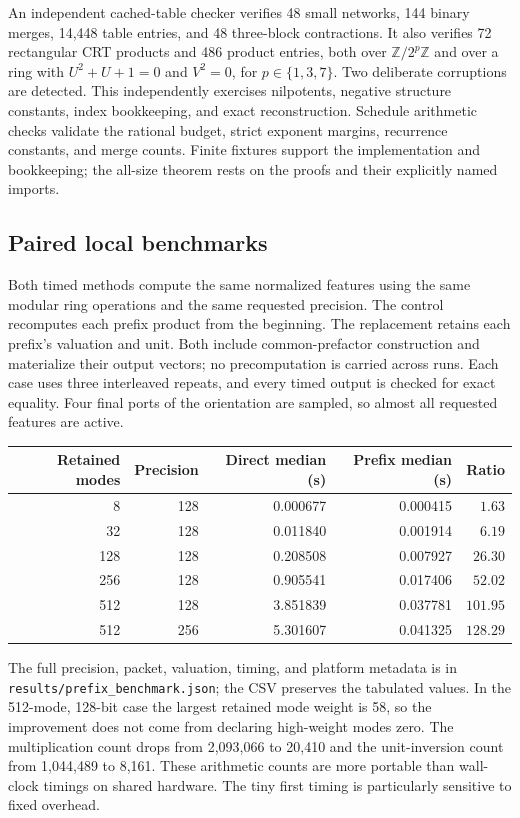 \documentclass[11pt,letterpaper]{article}
\theoremstyle{definition}\newtheorem{definition}[theorem]{Definition}
\theoremstyle{remark}\newtheorem{remark}[theorem]{Remark}
\begin{document}
An independent cached-table checker verifies 48 small networks, 144 binary merges,
14,448 table entries, and 48 three-block contractions. It also verifies 72 rectangular
CRT products and 486 product entries, both over $\mathbb Z/2^p\mathbb Z$ and over a
ring with $U^2+U+1=0$ and $V^2=0$, for $p\in\{1,3,7\}$. Two deliberate corruptions
are detected. This independently exercises nilpotents, negative structure constants,
index bookkeeping, and exact reconstruction. Schedule arithmetic checks validate the
rational budget, strict exponent margins, recurrence constants, and merge counts.
Finite fixtures support the implementation and bookkeeping; the all-size theorem rests
on the proofs and their explicitly named imports.

\subsection{Paired local benchmarks}
Both timed methods compute the same normalized features using the same modular ring
operations and the same requested precision. The control recomputes each prefix product
from the beginning. The replacement retains each prefix's valuation and unit. Both
include common-prefactor construction and materialize their output vectors; no
precomputation is carried across runs. Each case uses three interleaved repeats, and
every timed output is checked for exact equality. Four final ports of the orientation
are sampled, so almost all requested features are active.

\begin{center}
\begin{tabular}{@{}rrrrr@{}}
\toprule
Retained modes & Precision & Direct median (s) & Prefix median (s) & Ratio\\
\midrule
8 & 128 & 0.000677 & 0.000415 & $1.63$\\
32 & 128 & 0.011840 & 0.001914 & $6.19$\\
128 & 128 & 0.208508 & 0.007927 & $26.30$\\
256 & 128 & 0.905541 & 0.017406 & $52.02$\\
512 & 128 & 3.851839 & 0.037781 & $101.95$\\
512 & 256 & 5.301607 & 0.041325 & $128.29$\\
\bottomrule
\end{tabular}
\end{center}
The full precision, packet, valuation, timing, and platform metadata is in
\nolinkurl{results/prefix_benchmark.json}; the CSV preserves the tabulated values.
In the 512-mode, 128-bit case the largest retained mode weight is 58, so the improvement
does not come from declaring high-weight modes zero. The multiplication count drops
from 2,093,066 to 20,410 and the unit-inversion count from 1,044,489 to 8,161.
These arithmetic counts are more portable than wall-clock timings on shared hardware.
The tiny first timing is particularly sensitive to fixed overhead.
\end{document}
